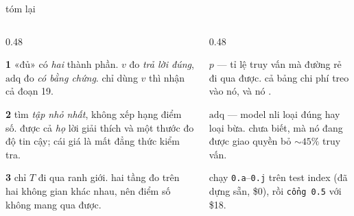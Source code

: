 \begin{frame}{tóm lại}
  \begin{columns}[t]
  \begin{column}{0.48\textwidth}
    \begin{keyb}[title={ba quyết định thiết kế}]
      \textbf{1}\; «đủ» có \emph{hai} thành phần. $v$ đo \emph{trả lời đúng},
      $\mathrm{adq}$ đo \emph{có bằng chứng}. chỉ dùng $v$ thì nhận cả đoạn 19.
      \vspace{0.4em}

      \textbf{2}\; tìm \emph{tập nhỏ nhất}, không xếp hạng điểm số. được cả
      \emph{họ} lời giải thích và một thước đo độ tin cậy; cái giá là mất
      đẳng thức kiểm tra.
      \vspace{0.4em}

      \textbf{3}\; chỉ $T$ đi qua ranh giới. hai tầng đo trên hai không gian
      khác nhau, nên điểm số không mang qua được.
    \end{keyb}
  \end{column}
  \begin{column}{0.48\textwidth}
    \begin{bx}[title={hai thứ còn phải chứng minh}]
      \textbf{$p$} — tỉ lệ truy vấn mà đường rẻ đi qua được. cả bảng chi phí treo
      vào nó, và nó .
      \vspace{0.4em}

      \textbf{$\mathrm{adq}$} — model nli loại đúng hay loại bừa. chưa biết, mà nó
      đang được giao quyền bỏ ${\sim}45\%$ truy vấn.
    \end{bx}
    \begin{bx}[title={bước tiếp theo}]
      chạy \texttt{0.a}--\texttt{0.j} trên test index (đã dựng sẵn, \$0),
      rồi \texttt{cổng 0.5} với \$18.
      \vspace{0.2em}

    \end{bx}
  \end{column}
  \end{columns}
\end{frame}
